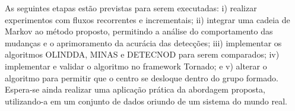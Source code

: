 \documentclass[msc, classic, a4paper]{ufbathesis}
\begin{document}
As seguintes etapas estão previstas para serem executadas:
i) realizar experimentos com fluxos recorrentes e incrementais;
ii) integrar uma cadeia de Markov ao método proposto, permitindo a análise do comportamento das mudanças e o aprimoramento da acurácia das detecções;
iii) implementar os algoritmos OLINDDA, MINAS e DETECNOD para serem comparados;
iv) implementar e validar o algoritmo no framework Tornado; e
v) alterar o algoritmo para permitir que o centro se desloque dentro do grupo formado.
Espera-se ainda realizar uma aplicação prática da abordagem proposta, utilizando-a em um conjunto de dados oriundo de um sistema do mundo real.

\backmatter





%
% 
% 

\end{document}
